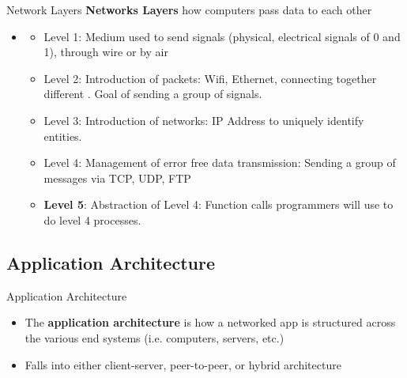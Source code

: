 \documentclass{beamer}
\begin{document}
        \begin{frame}{Network Layers}
         \textbf{Networks Layers} how computers pass data to each other
        \begin{itemize}
            \item \begin{itemize}
            \item Level 1: Medium used to send signals (physical, electrical signals of 0 and 1), through wire or by air
            \item Level 2: Introduction of packets: Wifi, Ethernet, connecting together different . Goal of sending a group of signals.
            \item Level 3: Introduction of networks: IP Address to uniquely identify entities. 
            \item Level 4: Management of error free data transmission: Sending a group of messages via TCP, UDP, FTP
            \item \textbf{Level 5}: Abstraction of Level 4: Function calls programmers will use to do level 4 processes.
            \end{itemize}
        \end{itemize}
    \end{frame}
    
    \subsection{Application Architecture}
    \begin{frame}{Application Architecture}
        \begin{itemize}
            \item The \textbf{application architecture} is how a networked app is structured across the various end systems (i.e. computers, servers, etc.) \cite{kurose}
            \item Falls into either client-server, peer-to-peer, or hybrid architecture
        \end{itemize}
    \end{frame}
\end{document}
